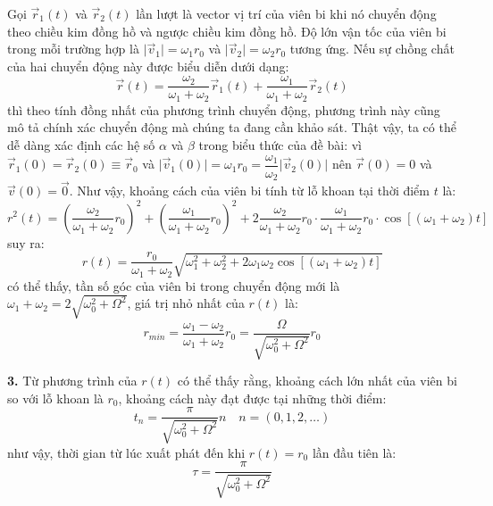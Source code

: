 \noindent Gọi $\vec{r}_{1}(t)$ và $\vec{r}_{2}(t)$ lần lượt là vector vị trí của viên bi khi nó chuyển động theo chiều kim đồng hồ và ngược chiều kim đồng hồ. Độ lớn vận tốc của viên bi trong mỗi trường hợp là $\lvert\vec{v}_{1}\rvert=\omega_{1}r_{0}$ và $\lvert\vec{v}_{2}\rvert=\omega_{2}r_{0}$ tương ứng. Nếu sự chồng chất của hai chuyển động này được biểu diễn dưới dạng:
\begin{equation*}
  \vec{r}(t)=\frac{\omega_{2}}{\omega_{1}+\omega_{2}}\vec{r}_{1}(t)+\frac{\omega_{1}}{\omega_{1}+\omega_{2}}\vec{r}_{2}(t)
\end{equation*}
thì theo tính đồng nhất của phương trình chuyển động, phương trình này cũng mô tả chính xác chuyển động mà chúng ta đang cần khảo sát. Thật vậy, ta có thể dễ dàng xác định các hệ số $\alpha$ và $\beta$ trong biểu thức của đề bài: vì $\vec{r}_{1}(0)=\vec{r}_{2}(0)\equiv\vec{r}_{0}$ và $\lvert\vec{v}_{1}(0)\rvert=\omega_{1}r_{0}=\dfrac{\omega_{1}}{\omega_{2}}\lvert\vec{v}_{2}(0)\rvert$ nên $\vec{r}(0)=0$ và $\vec{v}(0)=\vec{0}$. Như vậy, khoảng cách của viên bi tính từ lỗ khoan tại thời điểm $t$ là:
\begin{equation*}
  r^{2}(t)=\left(\frac{\omega_{2}}{\omega_{1}+\omega_{2}}r_{0}\right)^{2}+\left(\frac{\omega_{1}}{\omega_{1}+\omega_{2}}r_{0}\right)^{2}+2\frac{\omega_{2}}{\omega_{1}+\omega_{2}}r_{0}\cdot\frac{\omega_{1}}{\omega_{1}+\omega_{2}}r_{0}\cdot\cos[(\omega_{1}+\omega_{2})t]
\end{equation*}
suy ra:
\begin{equation*}
  r(t)=\frac{r_{0}}{\omega_{1}+\omega_{2}}\sqrt{\omega_{1}^{2}+\omega_{2}^{2}+2\omega_{1}\omega_{2}\cos[(\omega_{1}+\omega_{2})t]}
\end{equation*}
có thể thấy, tần số góc của viên bi trong chuyển động mới là $\omega_{1}+\omega_{2}=2\sqrt{\omega_{0}^{2}+\Omega^{2}}$, giá trị nhỏ nhất của $r(t)$ là:
\begin{equation*}
  r_{min}=\frac{\omega_{1}-\omega_{2}}{\omega_{1}+\omega_{2}}r_{0}=\frac{\Omega}{\sqrt{\omega_{0}^{2}+\Omega^{2}}}r_{0}
\end{equation*}

\noindent\textbf{3.} Từ phương trình của $r(t)$ có thể thấy rằng, khoảng cách lớn nhất của viên bi so với lỗ khoan là $r_{0}$, khoảng cách này đạt được tại những thời điểm:
\begin{equation*}
  t_{n}=\frac{\pi}{\sqrt{\omega_{0}^{2}+\Omega^{2}}}n\quad n=(0, 1, 2, \dots)
\end{equation*}
như vậy, thời gian từ lúc xuất phát đến khi $r(t)=r_{0}$ lần đầu tiên là:
\begin{equation*}
  \tau=\frac{\pi}{\sqrt{\omega_{0}^{2}+\Omega^{2}}}
\end{equation*}

